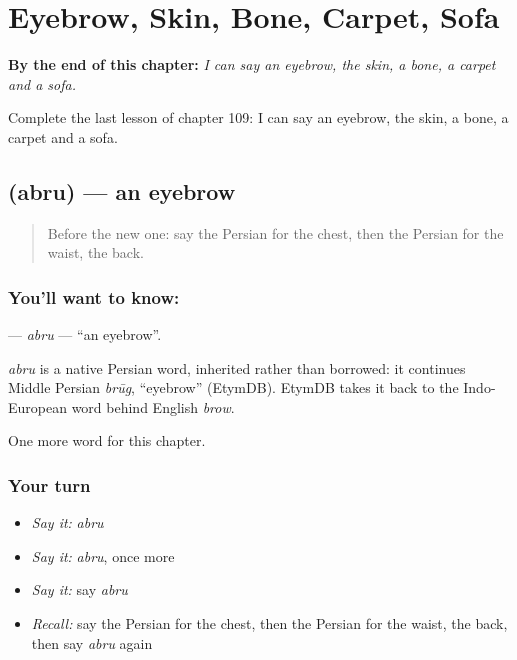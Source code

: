 
\chapter{Eyebrow, Skin, Bone, Carpet, Sofa}
\label{ch:fa-eyebrow-skin-bone-carpet-sofa}

\begin{chapteropening}
\textbf{By the end of this chapter:} \emph{I can say an eyebrow, the skin, a bone, a carpet and a sofa.}

Complete the last lesson of chapter 109: I can say an eyebrow, the skin, a bone, a carpet and a sofa.
\end{chapteropening}

\section[\texorpdfstring{\fa{ابرو} (abru)}{ابرو (abru)}]{ (abru) — an eyebrow}

\label{lesson:FA-C109-abru}



\begin{quote}
Before the new one: say the Persian for the chest, then the Persian for the waist, the back.
\end{quote}

\subsection*{You'll want to know: }
\textbf{} — \emph{abru} — \textquotedblleft{}an eyebrow\textquotedblright{}.

\begin{cousinweb}
\emph{abru} is a native Persian word, inherited rather than borrowed: it continues Middle Persian \emph{brūg}, \textquotedblleft{}eyebrow\textquotedblright{} (EtymDB). EtymDB takes it back to the Indo-European word behind English \emph{brow}.
\end{cousinweb}

\begin{grammarlens}[title={What you've built}]
One more word for this chapter.
\end{grammarlens}

\subsection*{Your turn}
\begin{itemize}
\raggedright
  \item \emph{Say it:} \emph{abru}
  \item \emph{Say it:} \emph{abru}, once more
  \item \emph{Say it:} say \emph{abru}
  \item \emph{Recall:} say the Persian for the chest, then the Persian for the waist, the back, then say \emph{abru} again
\end{itemize}

